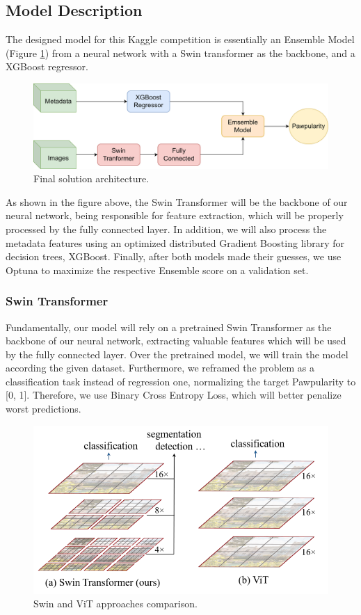 \documentclass{article}
\begin{document}
\subsection{Model Description}
The designed model for this Kaggle competition is essentially an Ensemble Model (Figure \ref{fig:arch}) from a neural network with a Swin transformer as the backbone, and a XGBoost regressor.

\begin{figure}[h!]
    \centering
    \includegraphics[width=0.8\linewidth]{figs/arch.png}
    \caption{Final solution architecture.}
    \label{fig:arch}
\end{figure}

As shown in the figure above, the Swin Transformer will be the backbone of our neural network, being responsible for feature extraction, which will be properly processed by the fully connected layer. In addition, we will also process the metadata features using an optimized distributed Gradient Boosting library for decision trees, XGBoost. Finally, after both models made their guesses, we use Optuna to maximize the respective Ensemble score on a validation set.

\subsubsection{Swin Transformer}
Fundamentally, our model will rely on a pretrained Swin Transformer as the backbone of our neural network, extracting valuable features which will be used by the fully connected layer. Over the pretrained model, we will train the model according the given dataset. Furthermore, we reframed the problem as a classification task instead of regression one, normalizing the target Pawpularity to [0, 1]. Therefore, we use Binary Cross Entropy Loss, which will better penalize worst predictions.

\begin{figure}[h!]
    \centering
    \includegraphics[width=0.7\linewidth]{figs/transformers.png}
    \caption{Swin and ViT approaches comparison.}
    \label{fig:transformers}
\end{figure}
\end{document}
